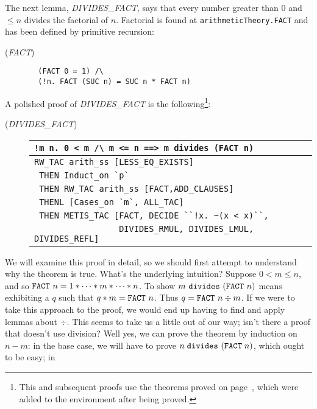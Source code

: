The next lemma, {\small{\it DIVIDES\_FACT\/}}, says that every number
greater than $0$ and $\leq n$ divides the factorial of
$n$. Factorial is found at \verb+arithmeticTheory.FACT+ and has been
defined by primitive recursion:
\begin{description}
\item [\small{({\it FACT\/})}]
\begin{minipage}[t]{0.5\textwidth}
\begin{verbatim}
  (FACT 0 = 1) /\
  (!n. FACT (SUC n) = SUC n * FACT n)
\end{verbatim}
\end{minipage}
\end{description}
A polished proof of {\small{\it DIVIDES\_FACT\/}} is the
following\footnote{This and subsequent proofs use the theorems proved
  on page~\pageref{euclid:extra-proofs}, which were added to the \ML{} environment
  after being proved.}:
\begin{description}
\item [\small{({\it DIVIDES\_FACT\/})}]
\begin{tabular}[t]{l}
\verb+!m n. 0 < m /\ m <= n ==> m divides (FACT n)+ \\ \hline
\verb+RW_TAC arith_ss [LESS_EQ_EXISTS]+ \\
\verb+ THEN Induct_on `p`+ \\
\verb+ THEN RW_TAC arith_ss [FACT,ADD_CLAUSES]+ \\
\verb+ THENL [Cases_on `m`, ALL_TAC]+ \\
\verb+ THEN METIS_TAC [FACT, DECIDE ``!x. ~(x < x)``,+ \\
\verb+                 DIVIDES_RMUL, DIVIDES_LMUL, DIVIDES_REFL]+ \\
\end{tabular}
\end{description}
We will examine this proof in detail, so we should first attempt to
understand why the theorem is true. What's the underlying intuition?
Suppose $0 < m \leq n$, and so $\mbox{\tt FACT}\ n = 1 * \cdots * m *
\cdots * n$. To show $m\ \mbox{\tt divides}\ (\mbox{\tt FACT}\ n)$
means exhibiting a $q$ such that $q * m = \mbox{\tt FACT}\ n$. Thus $q
= \mbox{\tt FACT}\ n \div m$. If we were to take this approach to the
proof, we would end up having to find and apply lemmas about $\div$.
This seems to take us a little out of our way; isn't there a proof
that doesn't use division? Well yes, we can prove the theorem by
induction on $n - m$: in the base case, we will have to prove $n\;
\mbox{\tt divides}\ (\mbox{\tt FACT}\; n)$, which ought to be easy; in
